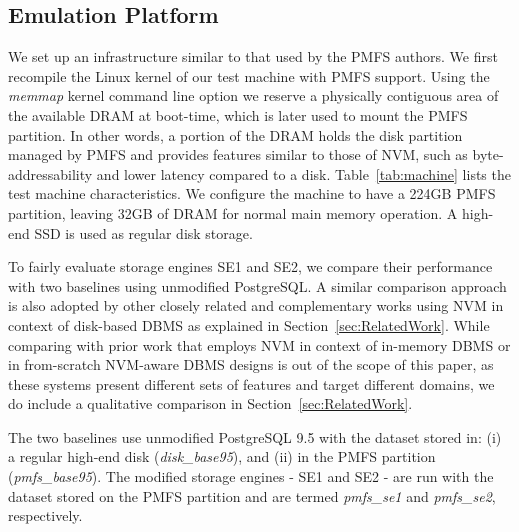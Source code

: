 \subsection{Emulation Platform}

We set up an infrastructure similar to that used by the PMFS authors. We first recompile the Linux kernel of our 
test machine with PMFS support. Using the \textit{memmap} kernel command line option we reserve a physically contiguous area of the 
available DRAM at boot-time, which is later used to mount the PMFS partition. In other words, a portion of the DRAM holds the disk 
partition managed by PMFS and provides features similar to those of NVM, such as byte-addressability and lower latency compared to a disk. 
Table~\ref{tab:machine} lists the test machine characteristics. We configure the machine to have a 224GB PMFS partition, leaving 32GB of 
DRAM for normal main memory operation. A high-end SSD is used as regular disk storage.

To fairly evaluate storage engines SE1 and SE2, we compare their performance with two baselines using unmodified PostgreSQL. A similar comparison approach is also adopted by other closely related and complementary works \cite{gao2011pcmlogging,son2017log} using NVM in context of disk-based DBMS as explained in Section~\ref{sec:RelatedWork}.
While comparing with prior work that employs NVM in context of in-memory
DBMS or in from-scratch NVM-aware DBMS designs is out of the scope of this paper, as these systems present different sets of features and target different domains, we do include a qualitative comparison in Section~\ref{sec:RelatedWork}.

The two baselines use unmodified  PostgreSQL 9.5 with the dataset stored in: (i) a regular high-end disk (\textit{disk\_base95}), and (ii) in the PMFS partition (\textit{pmfs\_base95}). The modified storage engines - SE1 and SE2 - are run with the dataset stored on the PMFS partition and are termed \textit{pmfs\_se1} and \textit{pmfs\_se2}, respectively.


